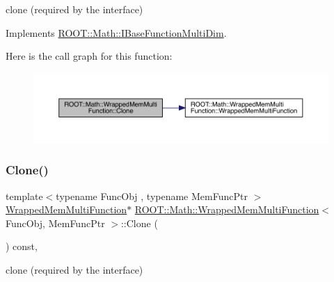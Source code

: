 clone (required by the interface) 



Implements \mbox{\hyperlink{classROOT_1_1Math_1_1IBaseFunctionMultiDim_a57939204b1f525b43835b42e0635dd3b}{R\+O\+O\+T\+::\+Math\+::\+I\+Base\+Function\+Multi\+Dim}}.

Here is the call graph for this function\+:
\nopagebreak
\begin{figure}[H]
\begin{center}
\leavevmode
\includegraphics[width=350pt]{d3/dd9/classROOT_1_1Math_1_1WrappedMemMultiFunction_ab9f49fc9a151e8d921dbe9cb148c1fc8_cgraph}
\end{center}
\end{figure}
\mbox{\label{classROOT_1_1Math_1_1WrappedMemMultiFunction_ab9f49fc9a151e8d921dbe9cb148c1fc8}} 
\subsubsection{\texorpdfstring{Clone()}{Clone()}\hspace{0.1cm}{\footnotesize\ttfamily [2/3]}}
{\footnotesize\ttfamily template$<$typename Func\+Obj , typename Mem\+Func\+Ptr $>$ \\
\mbox{\hyperlink{classROOT_1_1Math_1_1WrappedMemMultiFunction}{Wrapped\+Mem\+Multi\+Function}}$\ast$ \mbox{\hyperlink{classROOT_1_1Math_1_1WrappedMemMultiFunction}{R\+O\+O\+T\+::\+Math\+::\+Wrapped\+Mem\+Multi\+Function}}$<$ Func\+Obj, Mem\+Func\+Ptr $>$\+::Clone (\begin{DoxyParamCaption}{ }\end{DoxyParamCaption}) const\hspace{0.3cm}{\ttfamily [inline]}, {\ttfamily [virtual]}}



clone (required by the interface) 



